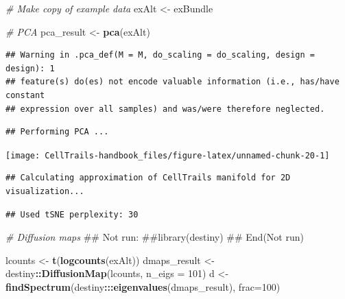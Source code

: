 \documentclass[]{book}
\newenvironment{Shaded}{\begin{snugshade}}{\end{snugshade}}
\newcommand{\KeywordTok}[1]{\textcolor[rgb]{0.13,0.29,0.53}{\textbf{#1}}}
\newcommand{\DataTypeTok}[1]{\textcolor[rgb]{0.13,0.29,0.53}{#1}}
\newcommand{\DecValTok}[1]{\textcolor[rgb]{0.00,0.00,0.81}{#1}}
\newcommand{\StringTok}[1]{\textcolor[rgb]{0.31,0.60,0.02}{#1}}
\newcommand{\CommentTok}[1]{\textcolor[rgb]{0.56,0.35,0.01}{\textit{#1}}}
\newcommand{\OperatorTok}[1]{\textcolor[rgb]{0.81,0.36,0.00}{\textbf{#1}}}
\newcommand{\NormalTok}[1]{#1}
\theoremstyle{definition}
\theoremstyle{definition}
\theoremstyle{definition}
\theoremstyle{remark}
\begin{document}
\begin{Shaded}
\begin{Highlighting}[]
\CommentTok{# Make copy of example data}
\NormalTok{exAlt <-}\StringTok{ }\NormalTok{exBundle}

\CommentTok{# PCA}
\NormalTok{pca_result <-}\StringTok{ }\KeywordTok{pca}\NormalTok{(exAlt)}
\end{Highlighting}
\end{Shaded}

\begin{verbatim}
## Warning in .pca_def(M = M, do_scaling = do_scaling, design = design): 1
## feature(s) do(es) not encode valuable information (i.e., has/have constant
## expression over all samples) and was/were therefore neglected.
\end{verbatim}

\begin{verbatim}
## Performing PCA ...
\end{verbatim}

\begin{Shaded}
\end{Shaded}

\texttt{[image: CellTrails-handbook\_files/figure-latex/unnamed-chunk-20-1]}

\begin{Shaded}
\end{Shaded}

\begin{verbatim}
## Calculating approximation of CellTrails manifold for 2D visualization...
\end{verbatim}

\begin{verbatim}
## Used tSNE perplexity: 30
\end{verbatim}

\begin{Shaded}
\begin{Highlighting}[]
\CommentTok{# Diffusion maps}
\NormalTok{## Not run: }
\NormalTok{##library(destiny)}
\NormalTok{## End(Not run)}

\NormalTok{lcounts <-}\StringTok{ }\KeywordTok{t}\NormalTok{(}\KeywordTok{logcounts}\NormalTok{(exAlt))}
\NormalTok{dmaps_result <-}\StringTok{ }\NormalTok{destiny}\OperatorTok{::}\KeywordTok{DiffusionMap}\NormalTok{(lcounts, }\DataTypeTok{n_eigs =} \DecValTok{101}\NormalTok{)}
\NormalTok{d <-}\StringTok{ }\KeywordTok{findSpectrum}\NormalTok{(destiny}\OperatorTok{:::}\KeywordTok{eigenvalues}\NormalTok{(dmaps_result), }\DataTypeTok{frac=}\DecValTok{100}\NormalTok{)}
\end{Highlighting}
\end{Shaded}
\end{document}
